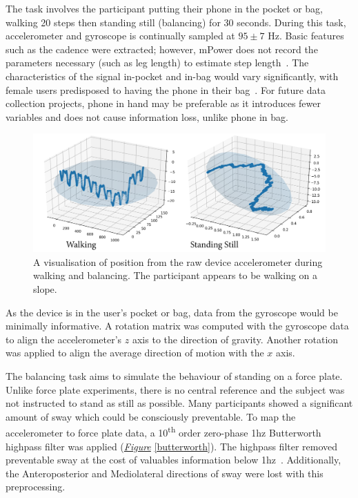 \documentclass[12pt, twoside]{book}
\renewcommand\emph[1]{\textit{\color{USred}{#1}}}
\begin{document}

The \emph{walking} task involves the participant putting their phone in the pocket or bag, walking 20 steps then standing still (balancing) for 30 seconds. During this task, accelerometer and gyroscope is continually sampled at $95\pm7$ Hz. Basic features such as the cadence were extracted; however, mPower does not record the parameters necessary (such as leg length) to estimate step length~\cite{diaz2014step}. The characteristics of the signal in-pocket and in-bag would vary significantly, with female users predisposed to having the phone in their bag~\cite{femalephone}. For future data collection projects, phone in hand may be preferable as it introduces fewer variables and does not cause information loss, unlike phone in bag.



\begin{figure}[!htb]
	\label{mpowerwalking}
	\centering\includegraphics[width=0.9\linewidth]{pathvis3d.png}
	\caption{A visualisation of position from the raw device accelerometer during walking and balancing. The participant appears to be walking on a slope.}
	\vspace{-0.5em}
\end{figure}


As the device is in the user's pocket or bag, data from the gyroscope would be minimally informative. A rotation matrix was computed with the gyroscope data to align the accelerometer's $z$ axis to the direction of gravity. Another rotation was applied to align the average direction of motion with the $x$ axis.

The balancing task aims to simulate the behaviour of standing on a force plate. Unlike force plate experiments, there is no central reference and the subject was not instructed to stand as still as possible. Many participants showed a significant amount of sway which could be consciously preventable. To map the accelerometer to force plate data, a 10\textsuperscript{th} order zero-phase 1hz Butterworth highpass filter was applied (\textit{\hyperref[butterworth]{Figure}} \ref{butterworth}). The highpass filter removed preventable sway at the cost of valuables information below 1hz~\cite{swayspectral}. Additionally, the Anteroposterior and Mediolateral directions of sway were lost with this preprocessing.
\end{document}
